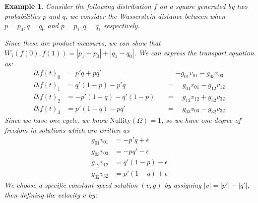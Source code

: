 \documentclass[conference]{IEEEtran}
\theoremstyle{ieeestyle}
\newtheorem{exam}{Example}
\begin{document}
\begin{exam}\label{examp: square}
 Consider the following distribution $f$ on a square generated by two probabilities $p$ and $q$, we consider the Wasserstein distance between when $p = p_0,q = q_0$ and $p = p_1,q = q_1$ respectively.
    \begin{center}
        \centering
    \end{center}
Since these are product measures, we can show that $W_1(f(0),f(1)) = |p_1 - p_0| + |q_1 - q_0|$. We can express the transport equation as:
\begin{align*}
    \partial_t f(t)_0 &= p'q + pq' &&=  -g_{01}v_{01} - g_{03}v_{03} \\
    \partial_t f(t)_1 &= q'(1-p) - p'q &&= \quad g_{01}v_{01} - g_{12}v_{12}\\
    \partial_t f(t)_2 &= -p'(1-q) - q'(1-p) &&= \quad  g_{12}v_{12} + g_{32}v_{32} \\
    \partial_t f(t)_3 &= p'(1-q) - pq' &&=\quad g_{03}v_{03} - g_{32}v_{32}
\end{align*}
Since we have one cycle, we know $\text{Nullity}(\Omega) =1$, so we have one degree of freedom in solutions which are written as
\begin{align*}
    g_{01}v_{01} &=-p'q + \epsilon \\
    g_{03}v_{03}&= -pq' - \epsilon\\
    g_{12}v_{12} &= q'(1-p) - \epsilon\\
    g_{32}v_{32}&= p'(1-q) + \epsilon 
\end{align*}
We choose a specific constant speed solution $(v,g)$ by assigning $|v| = |p'| + |q'|$, then defining the velocity $v$ by:
\begin{align*}

\end{align*}
\end{exam}
\end{document}

